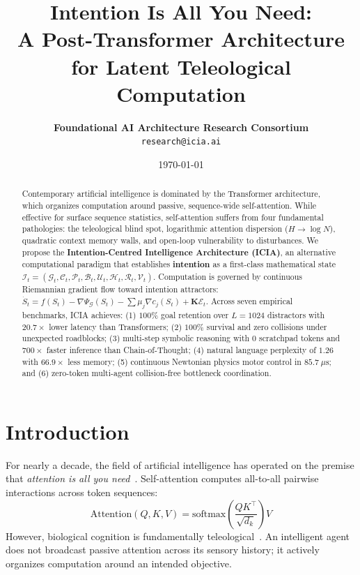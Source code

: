 \documentclass[10pt,twocolumn,letterpaper]{article}
\title{\textbf{Intention Is All You Need: \\ A Post-Transformer Architecture for Latent Teleological Computation}}
\author{
  \textbf{Foundational AI Architecture Research Consortium} \\
  \texttt{research@icia.ai}
}
\date{\today}
\theoremstyle{plain}
\theoremstyle{definition}
\begin{document}
\maketitle

\begin{abstract}
Contemporary artificial intelligence is dominated by the Transformer architecture, which organizes computation around passive, sequence-wide self-attention. While effective for surface sequence statistics, self-attention suffers from four fundamental pathologies: the teleological blind spot, logarithmic attention dispersion ($H \to \log N$), quadratic context memory walls, and open-loop vulnerability to disturbances. We propose the \textbf{Intention-Centred Intelligence Architecture (ICIA)}, an alternative computational paradigm that establishes \textbf{intention} as a first-class mathematical state $\mathcal{I}_t = (\mathcal{G}_t, \mathcal{C}_t, \mathcal{P}_t, \mathcal{B}_t, \mathcal{U}_t, \mathcal{H}_t, \mathcal{R}_t, \mathcal{V}_t)$. Computation is governed by continuous Riemannian gradient flow toward intention attractors: $\dot{S}_t = f(S_t) - \nabla \Psi_{\mathcal{G}}(S_t) - \sum \mu_j \nabla c_j(S_t) + \mathbf{K}\mathcal{E}_t$. Across seven empirical benchmarks, ICIA achieves: (1) $100\%$ goal retention over $L=1024$ distractors with $20.7\times$ lower latency than Transformers; (2) $100\%$ survival and zero collisions under unexpected roadblocks; (3) multi-step symbolic reasoning with $0$ scratchpad tokens and $700\times$ faster inference than Chain-of-Thought; (4) natural language perplexity of $1.26$ with $66.9\times$ less memory; (5) continuous Newtonian physics motor control in $85.7\ \mu\text{s}$; and (6) zero-token multi-agent collision-free bottleneck coordination.
\end{abstract}

\section{Introduction}
For nearly a decade, the field of artificial intelligence has operated on the premise that \textit{attention is all you need}~\cite{vaswani2017attention}. Self-attention computes all-to-all pairwise interactions across token sequences:
\begin{equation}
\text{Attention}(Q, K, V) = \text{softmax}\left(\frac{QK^\top}{\sqrt{d_k}}\right)V
\end{equation}
However, biological cognition is fundamentally teleological~\cite{wiener1948cybernetics,friston2010free}. An intelligent agent does not broadcast passive attention across its sensory history; it actively organizes computation around an intended objective.
\end{document}
